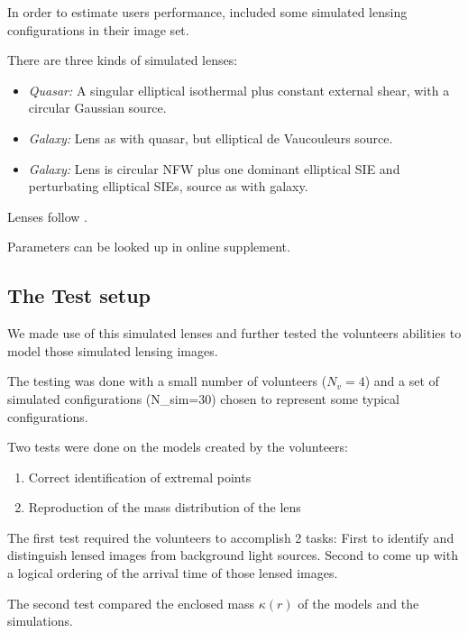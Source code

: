In order to estimate users performance, \sw included some simulated lensing configurations in their image set.

There are three kinds of simulated lenses:

\begin{itemize}
  \item {\em Quasar:\/} A singular elliptical isothermal plus constant
    external shear, with a circular Gaussian source.
  \item {\em Galaxy:\/} Lens as with quasar, but elliptical de
    Vaucouleurs source.
  \item {\em Galaxy:\/} Lens is circular NFW plus one dominant
    elliptical SIE and perturbating elliptical SIEs, source as with
    galaxy.
\end{itemize}
Lenses follow \cite{2001astro.ph..2341K,2001astro.ph..2340K}.

Parameters can be looked up in online supplement.


\subsection{The Test setup} \label{sec:testsetup}
We made use of this simulated lenses and further tested the volunteers abilities to model those simulated lensing images.

The testing was done with a small number of volunteers ($N_v=4$) and a set of simulated configurations (N_{sim}=30) chosen to represent some typical configurations.

Two tests were done on the models created by the volunteers:

\begin{enumerate}
  \item Correct identification of extremal points
  \item Reproduction of the mass distribution of the lens
\end{enumerate}

The first test required the volunteers to accomplish 2 tasks: First to identify and distinguish lensed images from background light sources.
Second to come up with a logical ordering of the arrival time of those lensed images.

The second test compared the enclosed mass $\kappa(r)$ of the models and the simulations.
